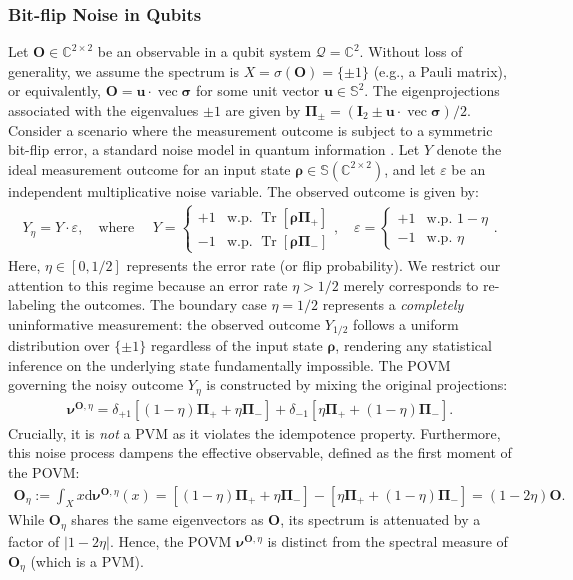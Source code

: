 \documentclass[noinfoline]{imsart}\setcounter{tocdepth}{2}
\renewcommand{\b}[1]{\mathbb{#1}} %
\newcommand{\m}[1]{\mathbf{#1}} %
\renewcommand{\c}[1]{\mathcal{#1}} %
\newcommand{\mb}[1]{\boldsymbol{#1}} %
\newcommand{\rd}{\mathrm{d}} %
\newcommand{\tr}[1]{\operatorname{Tr}\left[#1\right]}
\renewcommand{\vec}{\operatorname{vec}}
\theoremstyle{plain}
\begin{document}
\subsubsection{Bit-flip Noise in Qubits}\label{ssec:bit:flip}
Let $\m{O} \in \b{C}^{2 \times 2}$ be an observable in a qubit system $\c{Q} = \b{C}^{2}$. Without loss of generality, we assume the spectrum is $X = \sigma(\m{O}) = \{\pm 1\}$ (e.g., a Pauli matrix), or equivalently, $\m{O} = \m{u} \cdot \vec{\mb{\sigma}}$ for some unit vector $\m{u} \in \b{S}^{2}$. The eigenprojections associated with the eigenvalues $\pm 1$ are given by $\m{\Pi}_{\pm} = (\m{I}_{2} \pm \m{u} \cdot \vec{\mb{\sigma}})/2$.
Consider a scenario where the measurement outcome is subject to a symmetric bit-flip error, a standard noise model in quantum information \cite{nielsen2010quantum}. Let $Y$ denote the ideal measurement outcome for an input state $\mb{\rho} \in \b{S}(\b{C}^{2 \times 2})$, and let $\varepsilon$ be an independent multiplicative noise variable. The observed outcome is given by:
\begin{align*} 
    Y_{\eta} = Y \cdot \varepsilon, \quad \text{where } \quad 
    Y = \begin{cases} +1 & \text{w.p. } \tr{\mb{\rho} \m{\Pi}_{+}} \\ -1 & \text{w.p. } \tr{\mb{\rho} \m{\Pi}_{-}} \end{cases}, \quad 
    \varepsilon = \begin{cases} +1 & \text{w.p. } 1-\eta \\ -1 & \text{w.p. } \eta \end{cases}. 
\end{align*}
Here, $\eta \in [0, 1/2]$ represents the error rate (or flip probability). We restrict our attention to this regime because an error rate $\eta > 1/2$ merely corresponds to re-labeling the outcomes. The boundary case $\eta = 1/2$ represents a \emph{completely} uninformative measurement: the observed outcome $Y_{1/2}$ follows a uniform distribution over $\{\pm 1\}$ regardless of the input state $\mb{\rho}$, rendering any statistical inference on the underlying state fundamentally impossible.
The POVM governing the noisy outcome $Y_{\eta}$ is constructed by mixing the original projections:
\begin{align*}
    \mb{\nu}^{\m{O}, \eta} = \delta_{+1} [(1-\eta) \m{\Pi}_{+} + \eta \m{\Pi}_{-}] + \delta_{-1} [\eta \m{\Pi}_{+} + (1-\eta) \m{\Pi}_{-}].
\end{align*}
Crucially, it is \emph{not} a PVM as it violates the idempotence property. Furthermore, this noise process dampens the effective observable, defined as the first moment of the POVM:
\begin{align*}
    \m{O}_{\eta} := \int_{X} x \rd \mb{\nu}^{\m{O}, \eta} (x) 
    = [(1-\eta) \m{\Pi}_{+} + \eta \m{\Pi}_{-}] - [\eta \m{\Pi}_{+} + (1-\eta) \m{\Pi}_{-}] 
    = (1-2\eta) \m{O}.
\end{align*}
While $\m{O}_{\eta}$ shares the same eigenvectors as $\m{O}$, its spectrum is attenuated by a factor of $|1-2\eta|$. Hence, the POVM $\mb{\nu}^{\m{O}, \eta}$ is distinct from the spectral measure of $\m{O}_{\eta}$ (which is a PVM).
\end{document}
